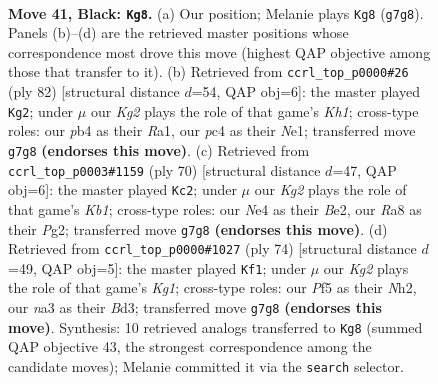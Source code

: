 \documentclass[11pt]{article}
\begin{document}
\clearpage

\begin{figure}[p]\centering
\begin{subfigure}{0.46\textwidth}\centering
\resizebox{\linewidth}{!}{%
\newchessgame
\chessboard[
  setfen={r1b5/p2p2k1/1pp5/5p1p/1PPPnP2/NB6/P3K2P/2R5 b - - 0 41},
  showmover=false,
  pgfstyle=straightmove, color=movearrow, markmove={g7-g8}
]}
\caption{}
\end{subfigure}\hfill
\begin{subfigure}{0.46\textwidth}\centering
\resizebox{\linewidth}{!}{%
\newchessgame
\chessboard[
  setfen={2r2bk1/5p2/4pBpp/3pP3/1n1P1PP1/7P/8/R3N2K w - - 2 42},
  showmover=false,
  pgfstyle=straightmove, color=movearrow, markmove={h1-g2}
]}
\caption{}
\end{subfigure}
\\[4pt]
\begin{subfigure}{0.46\textwidth}\centering
\resizebox{\linewidth}{!}{%
\newchessgame
\chessboard[
  setfen={4b3/3n1p1p/p2kpp2/Pp6/1P2P2P/4NP2/4B1P1/1K6 w - - 2 36},
  showmover=false,
  pgfstyle=straightmove, color=movearrow, markmove={b1-c2}
]}
\caption{}
\end{subfigure}\hfill
\begin{subfigure}{0.46\textwidth}\centering
\resizebox{\linewidth}{!}{%
\newchessgame
\chessboard[
  setfen={4b3/7k/4p1p1/ppb1P2p/3pPP2/3B2PP/P6N/6K1 w - - 0 38},
  showmover=false,
  pgfstyle=straightmove, color=movearrow, markmove={g1-f1}
]}
\caption{}
\end{subfigure}
\caption{\textbf{Move 41, Black: \texttt{Kg8}.} (a) Our position; Melanie plays \texttt{Kg8} (\texttt{g7g8}). Panels (b)--(d) are the retrieved master positions whose correspondence most drove this move (highest QAP objective among those that transfer to it). (b) Retrieved from \texttt{ccrl\_top\_p0000\#26} (ply 82) [structural distance $d$=54, QAP obj=6]: the master played \texttt{Kg2}; under $\mu$ our \emph{Kg2} plays the role of that game's \emph{Kh1}; cross-type roles: our \emph{p}b4 as their \emph{R}a1, our \emph{p}c4 as their \emph{N}e1; transferred move \texttt{g7g8} \textbf{(endorses this move)}. (c) Retrieved from \texttt{ccrl\_top\_p0003\#1159} (ply 70) [structural distance $d$=47, QAP obj=6]: the master played \texttt{Kc2}; under $\mu$ our \emph{Kg2} plays the role of that game's \emph{Kb1}; cross-type roles: our \emph{N}e4 as their \emph{B}e2, our \emph{R}a8 as their \emph{P}g2; transferred move \texttt{g7g8} \textbf{(endorses this move)}. (d) Retrieved from \texttt{ccrl\_top\_p0000\#1027} (ply 74) [structural distance $d$=49, QAP obj=5]: the master played \texttt{Kf1}; under $\mu$ our \emph{Kg2} plays the role of that game's \emph{Kg1}; cross-type roles: our \emph{P}f5 as their \emph{N}h2, our \emph{n}a3 as their \emph{B}d3; transferred move \texttt{g7g8} \textbf{(endorses this move)}. Synthesis: 10 retrieved analogs transferred to \texttt{Kg8} (summed QAP objective 43, the strongest correspondence among the candidate moves); Melanie committed it via the \texttt{search} selector.}
\label{fig:thought-m81}
\end{figure}
\end{document}
